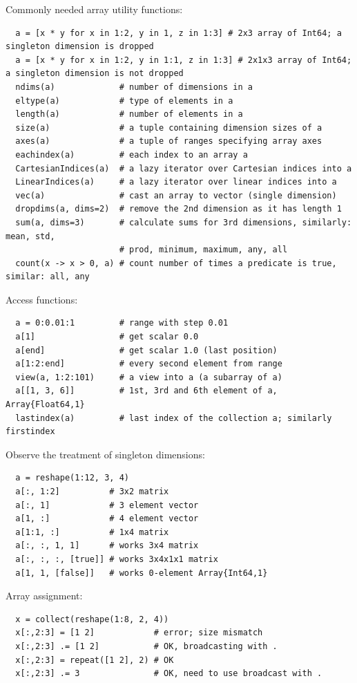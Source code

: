 \documentclass[10pt,a4paper]{article}
\begin{document}
Commonly needed array utility functions:
\begin{lstlisting}
  a = [x * y for x in 1:2, y in 1, z in 1:3] # 2x3 array of Int64; a singleton dimension is dropped
  a = [x * y for x in 1:2, y in 1:1, z in 1:3] # 2x1x3 array of Int64; a singleton dimension is not dropped
  ndims(a)             # number of dimensions in a
  eltype(a)            # type of elements in a
  length(a)            # number of elements in a
  size(a)              # a tuple containing dimension sizes of a
  axes(a)              # a tuple of ranges specifying array axes
  eachindex(a)         # each index to an array a
  CartesianIndices(a)  # a lazy iterator over Cartesian indices into a
  LinearIndices(a)     # a lazy iterator over linear indices into a
  vec(a)               # cast an array to vector (single dimension)
  dropdims(a, dims=2)  # remove the 2nd dimension as it has length 1
  sum(a, dims=3)       # calculate sums for 3rd dimensions, similarly: mean, std,
                       # prod, minimum, maximum, any, all
  count(x -> x > 0, a) # count number of times a predicate is true, similar: all, any
\end{lstlisting}

Access functions:
\begin{lstlisting}
  a = 0:0.01:1         # range with step 0.01
  a[1]                 # get scalar 0.0
  a[end]               # get scalar 1.0 (last position)
  a[1:2:end]           # every second element from range
  view(a, 1:2:101)     # a view into a (a subarray of a)
  a[[1, 3, 6]]         # 1st, 3rd and 6th element of a, Array{Float64,1}
  lastindex(a)         # last index of the collection a; similarly firstindex
\end{lstlisting}

Observe the treatment of singleton dimensions:
\begin{lstlisting}
  a = reshape(1:12, 3, 4)
  a[:, 1:2]          # 3x2 matrix
  a[:, 1]            # 3 element vector
  a[1, :]            # 4 element vector
  a[1:1, :]          # 1x4 matrix
  a[:, :, 1, 1]      # works 3x4 matrix
  a[:, :, :, [true]] # works 3x4x1x1 matrix
  a[1, 1, [false]]   # works 0-element Array{Int64,1}
\end{lstlisting}

Array assignment:
\begin{lstlisting}
  x = collect(reshape(1:8, 2, 4))
  x[:,2:3] = [1 2]            # error; size mismatch
  x[:,2:3] .= [1 2]           # OK, broadcasting with .
  x[:,2:3] = repeat([1 2], 2) # OK
  x[:,2:3] .= 3               # OK, need to use broadcast with .
\end{lstlisting}
\end{document}
